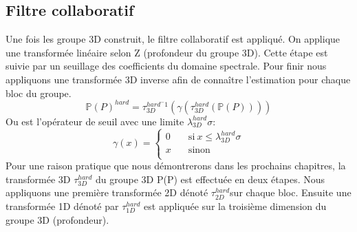 \subsection{Filtre collaboratif}
Une fois les groupe 3D construit, le filtre collaboratif est appliqué. On applique une transformée linéaire selon Z (profondeur du groupe 3D). Cette étape est suivie par un seuillage des coefficients du domaine spectrale. Pour finir nous appliquons une transformée 3D inverse afin de connaître l'estimation pour chaque bloc du groupe. 
\begin{equation}
\mathbb{P}(P)^{hard} = \tau^{hard^-1}_{3D} (\gamma (\tau^{hard}_{3D}(\mathbb{P}(P))))
\end{equation}
Ou \gamma \: est l'opérateur de seuil avec une limite \(\lambda^{hard}_{3D}\sigma\):
\[ \gamma(x) =
  \begin{cases}
    0       & \quad \text{si} \: x  \leq \lambda^{hard}_{3D}\sigma \\
    x       & \quad \text{sinon}\\
  \end{cases}
\]
Pour une raison pratique que nous démontrerons dans les prochains chapitres, la transformée 3D \(\tau^{hard}_{3D}\) du groupe 3D P(P) est effectuée en deux étapes. Nous appliquons une première transformée 2D dénoté \(\tau^{hard}_{2D}\)sur chaque bloc. Ensuite une transformée 1D dénoté par \(\tau^{hard}_{1D}\) est appliquée sur la troisième dimension du groupe 3D (profondeur).  


